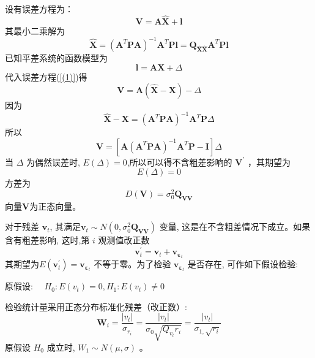 \documentclass[12pt,hyperref,a4paper,UTF8]{ctexart}
\begin{document}
设有误差方程为：
\begin{equation}
\mathbf{V} = \mathbf{A} \mathbf{\hat{X}} + \mathbf{l}
\label{(1)}
\end{equation}
其最小二乘解为
\begin{equation}
\mathbf{\hat{X}} = \left(\mathbf{A}^T \mathbf{P} \mathbf{A}\right)^{-1} \mathbf{A}^T \mathbf{P} \mathbf{l} = \mathbf{Q}_{\hat{\mathbf{X}} \hat{\mathbf{X}}} \mathbf{A}^T \mathbf{P} \mathbf{l}
\end{equation}
已知平差系统的函数模型为
\begin{equation}
\mathbf{l} = \mathbf{A} \mathbf{X} + \Delta
\end{equation}
代入误差方程(\ref{(1)})得
\begin{equation}
\mathbf{V} = \mathbf{A} (\mathbf{\hat{X}} - \mathbf{X}) - \Delta
\end{equation}
因为
\begin{equation}
\mathbf{\hat{X}} - \mathbf{X} = \left(\mathbf{A}^T \mathbf{P} \mathbf{A}\right)^{-1} \mathbf{A}^T \mathbf{P} \Delta
\end{equation}
所以
\begin{equation}
\mathbf{V} = \left[\mathbf{A} \left(\mathbf{A}^T \mathbf{P} \mathbf{A}\right)^{-1} \mathbf{A}^T \mathbf{P} - \mathbf{I}\right] \Delta
\end{equation}
当 $\Delta$ 为偶然误差时, $E(\Delta)=0$,所以可以得不含粗差影响的 $\mathbf{V}^{\prime}$ ，其期望为
\begin{equation}
    E(\Delta) = 0 
\end{equation}
方差为
\begin{equation}
D(\mathbf{V}) = \sigma_0^2 \mathbf{Q}_{\mathbf{V} \mathbf{V}}
\end{equation}
向量$\mathbf{V}$为正态向量。

对于残差 $\mathbf{v}_t$, 其满足$\mathbf{v}_t \sim N\left(0, \sigma_0^2 \mathbf{Q}_{\mathbf{V} \mathbf{V}}\right)$ 变量, 这是在不含粗差情况下成立。如果含有粗差影响, 这时,第 $i$ 观测值改正数
\begin{equation}
\mathbf{v}_t^{\prime} = \mathbf{v}_t + \mathbf{v}_{\mathbf{\varepsilon}_t}
\end{equation}
其期望为$E\left(\mathbf{v}_t^{\prime}\right) = \mathbf{v}_{\mathbf{\varepsilon}_t}$
不等于零。为了检验 $\mathbf{v}_{\mathbf{\varepsilon}_t}$ 是否存在, 可作如下假设检验:

原假设: $\quad H_0: E\left(v_t\right)=0, H_1: E\left(v_t\right) \neq 0$

检验统计量采用正态分布标准化残差（改正数）:
\begin{equation}
    \mathbf{W}_i=\frac{\left|v_t\right|}{\sigma_{r_i}}=\frac{\left|v_t\right|}{\sigma_0 \sqrt{Q_{v_t} r_i}}=\frac{\left|v_t\right|}{\sigma_{1,} \sqrt{r_i}}
\end{equation}
原假设 $H_0$ 成立时, $W_1 \sim N(\mu, \sigma)$ 。
\end{document}
